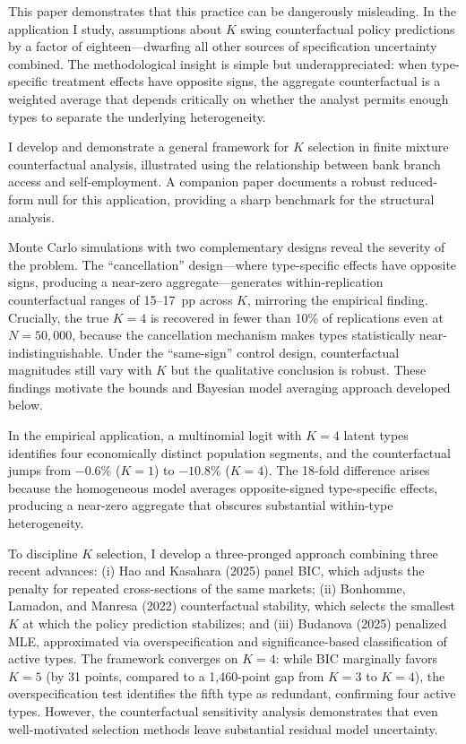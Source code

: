 \documentclass[12pt]{article}
\begin{document}
This paper demonstrates that this practice can be dangerously misleading. In the application I study, assumptions about $K$ swing counterfactual policy predictions by a factor of eighteen---dwarfing all other sources of specification uncertainty combined. The methodological insight is simple but underappreciated: when type-specific treatment effects have opposite signs, the aggregate counterfactual is a weighted average that depends critically on whether the analyst permits enough types to separate the underlying heterogeneity.

I develop and demonstrate a general framework for $K$ selection in finite mixture counterfactual analysis, illustrated using the relationship between bank branch access and self-employment. A companion paper \citep{malkova2026substantive} documents a robust reduced-form null for this application, providing a sharp benchmark for the structural analysis.

Monte Carlo simulations with two complementary designs reveal the severity of the problem. The ``cancellation'' design---where type-specific effects have opposite signs, producing a near-zero aggregate---generates within-replication counterfactual ranges of 15--17~pp across $K$, mirroring the empirical finding. Crucially, the true $K=4$ is recovered in fewer than 10\% of replications even at $N = 50{,}000$, because the cancellation mechanism makes types statistically near-indistinguishable. Under the ``same-sign'' control design, counterfactual magnitudes still vary with $K$ but the qualitative conclusion is robust. These findings motivate the bounds and Bayesian model averaging approach developed below.

In the empirical application, a multinomial logit with $K=4$ latent types identifies four economically distinct population segments, and the counterfactual jumps from $-0.6\%$ ($K=1$) to $-10.8\%$ ($K=4$). The 18-fold difference arises because the homogeneous model averages opposite-signed type-specific effects, producing a near-zero aggregate that obscures substantial within-type heterogeneity.

To discipline $K$ selection, I develop a three-pronged approach combining three recent advances: (i) Hao and Kasahara (2025) panel BIC, which adjusts the penalty for repeated cross-sections of the same markets; (ii) Bonhomme, Lamadon, and Manresa (2022) counterfactual stability, which selects the smallest $K$ at which the policy prediction stabilizes; and (iii) Budanova (2025) penalized MLE, approximated via overspecification and significance-based classification of active types. The framework converges on $K=4$: while BIC marginally favors $K=5$ (by 31 points, compared to a 1,460-point gap from $K=3$ to $K=4$), the overspecification test identifies the fifth type as redundant, confirming four active types. However, the counterfactual sensitivity analysis demonstrates that even well-motivated selection methods leave substantial residual model uncertainty.
\end{document}
